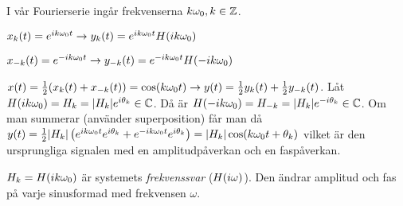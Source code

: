 \documentclass[a4paper]{article}
\begin{document}
I vår Fourierserie ingår frekvenserna \(
    k\omega_0, k \in \mathbb{Z}
\). 

\(
    x_k(t) = e^{ik\omega_0 t} \to y_k(t) = e^{ik\omega_0 t} H(ik\omega_0)
\) 

\(
    x_{-k}(t) = e^{-ik\omega_0 t} \to y_{-k}(t) = e^{-ik\omega_0 t} H(-ik\omega_0)
\) 

\(
    x(t) = \frac{1}{2} (x_k(t) + x_{-k} (t)) = \cos(k\omega_0 t) 
    \to y(t) = \frac{1}{2} y_k(t) + \frac{1}{2} y_{-k}(t)
\). Låt \(
    H(ik\omega_0) = H_k = \abs{H_k} e^{i\theta_k}\in \mathbb{C}
\). Då är \(
    H(-ik\omega_0) = H_{-k} = \abs{H_k} e^{-i\theta_k}\in \mathbb{C}
\). Om man summerar (använder superposition) får man då \(
    y(t) = \frac{1}{2} \abs{H_k} \left( e^{ik\omega_0 t} e^{i\theta_k} + e^{-ik\omega_0 t} e^{i\theta_k} \right)
    = \abs{H_k} \cos(k\omega_0 t + \theta_k)
\) vilket är den ursprungliga signalen med en amplitudpåverkan och en 
faspåverkan. 

\(
    H_k = H(ik\omega_0) 
\) är systemets \emph{frekvenssvar} (\(
    H(i\omega)
\)). Den ändrar amplitud och fas på varje sinusformad med frekvensen \(
    \omega
\).
\end{document}
